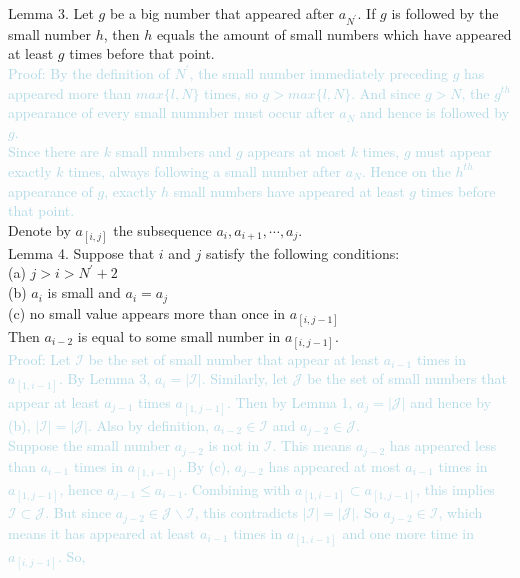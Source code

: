 \documentclass{Math_Note}
\begin{document}
\begin{sol}
Lemma 3. Let $g$ be a big number that appeared after $a_{N^{'}}$. If $g$ is followed by the small number $h$, then $h$ equals the amount of small numbers which have appeared at least $g$ times before that point. \\
\textcolor{lightblue}{
Proof: 
By the definition of $N^{'}$, the small number immediately preceding $g$ has appeared more than $max\{l,N\}$ times, so $g>max\{l,N\}$. And since $g>N$, the $g^{th}$ appearance of every small nummber 
must occur after $a_{N}$ and hence is followed by $g$. \\
Since there are $k$ small numbers and $g$ appears at most $k$ times, $g$ must appear exactly $k$ times, always following a small number after $a_{N}$. Hence on the $h^{th}$ appearance of $g$, exactly $h$ small numbers 
have appeared at least $g$ times before that point. \\
}
Denote by $a_{\left[i,j\right]}$ the subsequence $a_{i}, a_{i+1},\cdots, a_{j}$. \\
Lemma 4. Suppose that $i$ and $j$ satisfy the following conditions: \\
(a) $j>i>N^{'}+2$ \\
(b) $a_{i}$ is small and $a_{i}=a_{j}$ \\
(c) no small value appears more than once in $a_{\left[i,j-1\right]}$ \\
Then $a_{i-2}$ is equal to some small number in $a_{\left[i,j-1\right]}$. \\
\textcolor{lightblue}{
Proof: 
Let $\mathcal{I}$ be the set of small number that appear at least $a_{i-1}$ times in $a_{\left[1,i-1\right]}$. By Lemma 3, $a_{i}=\vert\mathcal{I}\vert$. Similarly, let $\mathcal{J}$ be the set of small numbers 
that appear at least $a_{j-1}$ times $a_{\left[1,j-1\right]}$. Then by Lemma 1, $a_{j}=\vert\mathcal{J}\vert$ and hence by (b), $\vert\mathcal{I}\vert=\vert\mathcal{J}\vert$. Also by definition, $a_{i-2}\in\mathcal{I}$ 
and $a_{j-2}\in\mathcal{J}$. \\
Suppose the small number $a_{j-2}$ is not in $\mathcal{I}$. This means $a_{j-2}$ has appeared less than $a_{i-1}$ times in $a_{\left[1,i-1\right]}$. By (c), $a_{j-2}$ has appeared at most $a_{i-1}$ times in 
$a_{\left[1,j-1\right]}$, hence $a_{j-1}\leq a_{i-1}$. Combining with $a_{\left[1,i-1\right]}\subset a_{\left[1,j-1\right]}$, this implies $\mathcal{I}\subset\mathcal{J}$. But since $a_{j-2}\in\mathcal{J}\backslash\mathcal{I}$, 
this contradicts $\vert\mathcal{I}\vert=\vert\mathcal{J}\vert$. So $a_{j-2}\in\mathcal{I}$, which means it has appeared at least $a_{i-1}$ times in $a_{\left[1,i-1\right]}$ and one more time in $a_{\left[i,j-1\right]}$. So, 
}
\end{sol}
\end{document}

